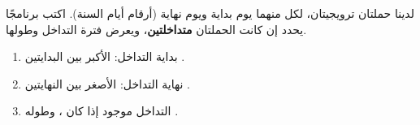 \begin{statement}
لدينا حملتان ترويجيتان، لكل منهما يوم بداية ويوم نهاية (أرقام أيام السنة). اكتب برنامجًا يحدد إن كانت الحملتان \textbf{متداخلتين}، ويعرض فترة التداخل وطولها.
\end{statement}
\begin{stepsbox}\begin{enumerate}
\item بداية التداخل: الأكبر بين البدايتين .
\item نهاية التداخل: الأصغر بين النهايتين .
\item التداخل موجود إذا كان ، وطوله .
\end{enumerate}\end{stepsbox}

